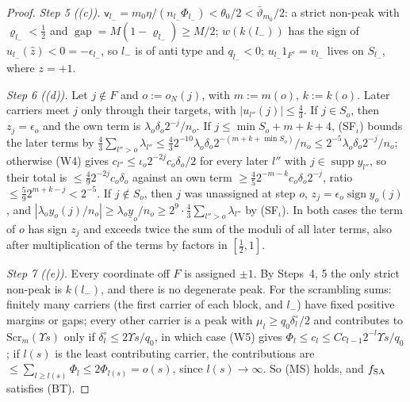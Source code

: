 \documentclass[10pt]{amsart}
\theoremstyle{definition}
\theoremstyle{remark}
\newcommand{\supp}{\operatorname{supp}}
\newcommand{\sgn}{\operatorname{sign}}
\newcommand{\gap}{\operatorname{gap}}
\newcommand{\zh}{\hat z}
\begin{document}
\begin{proof}
\emph{Step 5 ((c)).}  $\mathsf v_{l_-}=m_0\eta/(n_{l_-}\Phi_{l_-})<\theta_0/2<
\bar\vartheta_{m_0}/2$: a strict non-peak with $\varrho_{l_-}<\frac12$ and $\gap=
M(1-\varrho_{l_-})\ge M/2$; $w(k(l_-))$ has the sign of $u_{l_-}(\zh)<0=-\epsilon_{l_-}$,
so $l_-$ is of anti type and $q_{l_-}<0$; $u_{l_-}1_{F^c}=v_{l_-}$ lives on
$S_{l_-}$, where $z=+1$.

\emph{Step 6 ((d)).}  Let $j\notin F$ and $o:=o_N(j)$, with $m:=m(o)$,
$k:=k(o)$.  Later carriers meet $j$ only through their targets, with
$|u_{l''}(j)|\le\frac43$.  If $j\in S_o$, then $z_j=\epsilon_o$ and the own
term is $\lambda_o\delta_o2^{-j}/n_o$.  If $j\le\min S_o+m+k+4$, (SF$_\iota$)
bounds the later terms by $\frac43\sum_{l''>o}\lambda_{l''}\le\frac432^{-10}
\lambda_o\delta_o2^{-(m+k+\min S_o)}/n_o\le2^{-5}\lambda_o\delta_o2^{-j}/n_o$;
otherwise (W4) gives $c_{l''}\le\iota_o2^{-2j}c_o\delta_o/2$ for every later
$l''$ with $j\in\supp y_{l''}$, so their total is $\le\frac492^{-2j}c_o\delta_o$
against an own term $\ge\frac452^{-m-k}c_o\delta_o2^{-j}$, ratio $\le\frac592^{m+k-j}
<2^{-5}$.  If $j\notin S_o$, then $j$ was unassigned at step $o$, $z_j=
\epsilon_o\sgn y_o(j)$, and $|\lambda_oy_o(j)/n_o|\ge\lambda_o\underline y_o/n_o\ge
2^9\cdot\frac43\sum_{l''>o}\lambda_{l''}$ by (SF$_\iota$).  In both cases the term
of $o$ has sign $z_j$ and exceeds twice the sum of the moduli of all later
terms, also after multiplication of the terms by factors in $[\frac12,1]$.

\emph{Step 7 ((e)).}  Every coordinate off $F$ is assigned $\pm1$.  By
Steps~4, 5 the only strict non-peak is $k(l_-)$, and there is no degenerate
peak.  For the scrambling sums: finitely many carriers (the first carrier of
each block, and $l_-$) have fixed positive margins or gaps; every other
carrier is a peak with $\mu_l\ge q_0\delta^\circ_l/2$ and contributes to
$\mathrm{Scr}_m(\Upsilon s)$ only if $\delta^\circ_l\le2\Upsilon s/q_0$, in which case
(W5) gives $\Phi_l\le c_l\le C c_{l-1}2^{-l}\Upsilon s/q_0$; if $l(s)$ is the least
contributing carrier, the contributions are $\le\sum_{l\ge l(s)}\Phi_l\le2\Phi_{l(s)}
=o(s)$, since $l(s)\to\infty$.  So (MS) holds, and $f_{\rm SA}$ satisfies (BT).


\end{proof}
\end{document}
